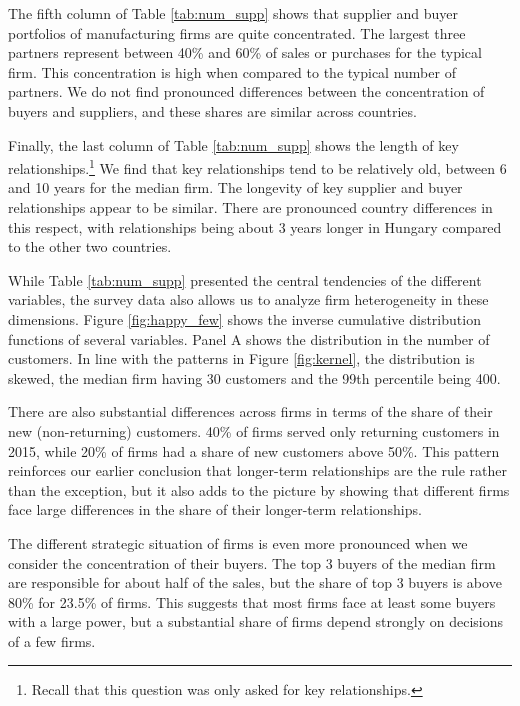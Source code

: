 \documentclass[final, dvipsnames, authoryear,12pt]{elsarticle}
\begin{document}
The fifth column of Table \ref{tab:num_supp} shows that supplier and buyer portfolios of manufacturing firms are quite concentrated. The largest three partners represent between 40\% and 60\% of sales or purchases for the typical firm. This concentration is high when compared to the typical number of partners. We do not find pronounced differences between the concentration of buyers and suppliers, and these shares are similar across countries.

Finally, the last column of Table \ref{tab:num_supp} shows the length of key relationships.\footnote{Recall that this question was only asked for key relationships.} We find that key relationships tend to be relatively old, between 6 and 10 years for the median firm. The longevity of key supplier and buyer relationships appear to be similar. There are pronounced country differences in this respect, with relationships being about 3 years longer in Hungary compared to the other two countries. 

While Table \ref{tab:num_supp} presented the central tendencies of the different variables, the survey data also allows us to analyze firm heterogeneity in these dimensions. Figure \ref{fig:happy_few} shows the inverse cumulative distribution functions of several variables. Panel A shows the distribution in the number of customers. In line with the patterns in Figure \ref{fig:kernel}, the distribution is skewed, the median firm having 30 customers and the 99th percentile being 400.

There are also substantial differences across firms in terms of the share of their new (non-returning) customers. 40\% of firms served only returning customers in 2015, while 20\% of firms had a share of new customers above 50\%. This pattern reinforces our earlier conclusion that longer-term relationships are the rule rather than the exception, but it also adds to the picture by showing that different firms face large differences in the share of their longer-term relationships.

The different strategic situation of firms is even more pronounced when we consider the concentration of their buyers. The top 3 buyers of the median firm are responsible for about half of the sales, but the share of top 3 buyers is above 80\% for 23.5\% of firms. This suggests that most firms face at least some buyers with a large power, but a substantial share of firms depend strongly on decisions of a few firms.
\end{document}
